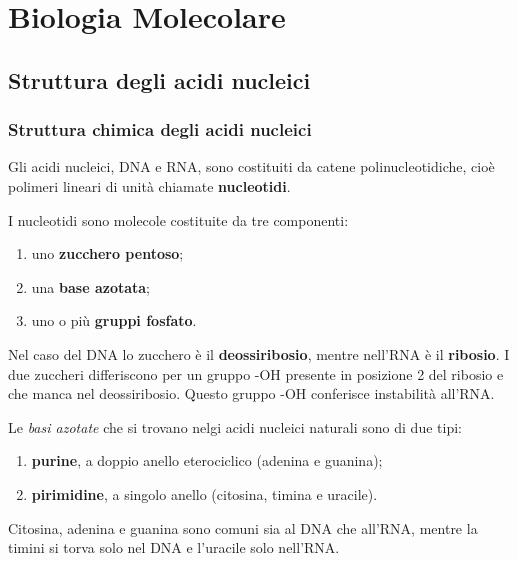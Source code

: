 \documentclass[]{article}
\date{}
\begin{document}
\section{Biologia Molecolare}\label{biologia-molecolare}

\subsection{Struttura degli acidi
nucleici}\label{struttura-degli-acidi-nucleici}

\subsubsection{Struttura chimica degli acidi
nucleici}\label{struttura-chimica-degli-acidi-nucleici}

Gli acidi nucleici, DNA e RNA, sono costituiti da catene
polinucleotidiche, cioè polimeri lineari di unità chiamate
\textbf{nucleotidi}.

I nucleotidi sono molecole costituite da tre componenti:

\begin{enumerate}
\def\labelenumi{\arabic{enumi}.}
\itemsep1pt\parskip0pt
\item
  uno \textbf{zucchero pentoso};
\item
  una \textbf{base azotata};
\item
  uno o più \textbf{gruppi fosfato}.
\end{enumerate}

Nel caso del DNA lo zucchero è il \textbf{deossiribosio}, mentre
nell'RNA è il \textbf{ribosio}. I due zuccheri differiscono per un
gruppo -OH presente in posizione 2 del ribosio e che manca nel
deossiribosio. Questo gruppo -OH conferisce instabilità all'RNA.

Le \emph{basi azotate} che si trovano nelgi acidi nucleici naturali sono
di due tipi:

\begin{enumerate}
\def\labelenumi{\arabic{enumi}.}
\itemsep1pt\parskip0pt
\item
  \textbf{purine}, a doppio anello eterociclico (adenina e guanina);
\item
  \textbf{pirimidine}, a singolo anello (citosina, timina e uracile).
\end{enumerate}

Citosina, adenina e guanina sono comuni sia al DNA che all'RNA, mentre
la timini si torva solo nel DNA e l'uracile solo nell'RNA.
\end{document}
